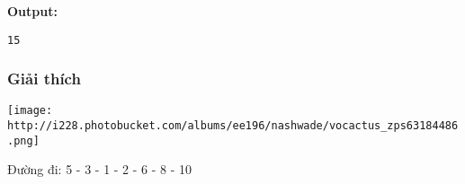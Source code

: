 \textbf{    Output:   }
\begin{verbatim}
15\end{verbatim}

\subsubsection{   Giải thích  }


\texttt{[image: http://i228.photobucket.com/albums/ee196/nashwade/vocactus\_zps63184486.png]}

   Đường đi: 5 - 3 - 1 - 2 - 6 - 8 - 10  
